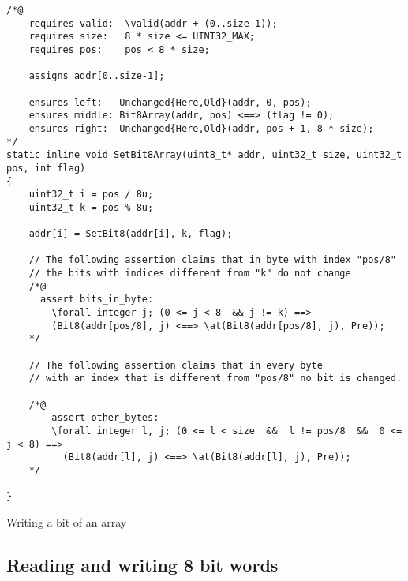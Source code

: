 \begin{listing}[hbt]
\begin{minipage}{0.99\textwidth}
\begin{lstlisting}[style=acsl-block]
/*@
    requires valid:  \valid(addr + (0..size-1));
    requires size:   8 * size <= UINT32_MAX;
    requires pos:    pos < 8 * size;

    assigns addr[0..size-1];

    ensures left:   Unchanged{Here,Old}(addr, 0, pos);
    ensures middle: Bit8Array(addr, pos) <==> (flag != 0);
    ensures right:  Unchanged{Here,Old}(addr, pos + 1, 8 * size);
*/
static inline void SetBit8Array(uint8_t* addr, uint32_t size, uint32_t pos, int flag)
{
    uint32_t i = pos / 8u;
    uint32_t k = pos % 8u;

    addr[i] = SetBit8(addr[i], k, flag);

    // The following assertion claims that in byte with index "pos/8"
    // the bits with indices different from "k" do not change
    /*@
      assert bits_in_byte:
        \forall integer j; (0 <= j < 8  && j != k) ==>
        (Bit8(addr[pos/8], j) <==> \at(Bit8(addr[pos/8], j), Pre));
    */

    // The following assertion claims that in every byte
    // with an index that is different from "pos/8" no bit is changed.

    /*@
        assert other_bytes:
        \forall integer l, j; (0 <= l < size  &&  l != pos/8  &&  0 <= j < 8) ==>
          (Bit8(addr[l], j) <==> \at(Bit8(addr[l], j), Pre));
    */

}
\end{lstlisting}
\end{minipage}
\caption{\label{lst:SetBit8Array}Writing a bit of an  array}
\end{listing}








\FloatBarrier

\subsection{Reading and writing 8 bit words}
\label{subsec:low-level 8}










